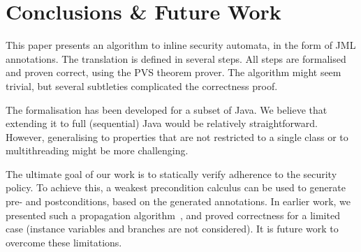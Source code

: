 \section{Conclusions \& Future Work }\label{SecConcl}

This paper presents an algorithm to inline security automata, in the
form of JML annotations. The translation is defined in several
steps. All steps are formalised and proven correct, using the PVS
theorem prover. The algorithm might seem trivial, but several
subtleties complicated the correctness proof.


The formalisation has been developed for a subset of Java. We believe
that extending it to full (sequential) Java would be relatively
straightforward. However, generalising to properties that are not
restricted to a single class or to multithreading might be more
challenging.
%

The ultimate goal of our work is to statically verify adherence to the
security policy. To achieve this, a weakest precondition calculus can
be used to generate pre- and postconditions, based on the generated
\Set annotations. In earlier work, we presented such a
propagation algorithm~\cite{PavlovaBBHL04}, and proved correctness for
a limited case (instance variables and branches are not
considered). It is future work to overcome these limitations.

